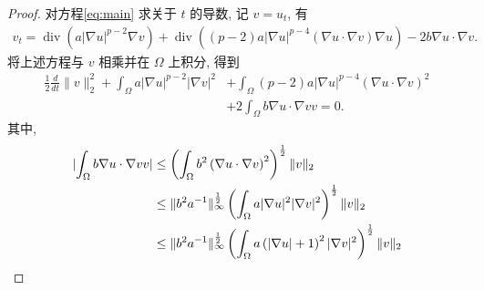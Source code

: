 \documentclass[oneside,longtitle]{LZUthesis}
\newtheorem{proofpart}{part}
\numberwithin{equation}{chapter}
\newcommand*\abs[1]{\lvert#1\rvert}
\newcommand*\norm[1]{\lVert#1\rVert}
\newcommand*\Brace[1]{\lbrace#1\rbrace}
\newcommand\R{\mathbb{R}}
\DeclareMathOperator{\Div}{div}
\begin{document}
\begin{proof}
	对方程\eqref{eq:main} 求关于 $t$ 的导数, 记 $v = u_t$, 有
	\begin{equation*}
		\begin{split}
			v_t
			= \Div\left(a\abs{\nabla u}^{p-2}\nabla v\right)
			+ \Div\left(\left(p-2\right)a \abs{\nabla u}^{p-4}\left(\nabla u \cdot \nabla v\right)\nabla u\right)
			- 2b\nabla u \cdot \nabla v.
		\end{split}
	\end{equation*}
	将上述方程与 $v$ 相乘并在 $\Omega$ 上积分, 得到
	\begin{equation*}
		\begin{split}
			\frac{1}{2}\frac{d}{dt}\norm{v}_2^2
			+ \int_{\Omega}a\abs{\nabla u}^{p-2}\abs{\nabla v}^2
			&+ \int_{\Omega}\left(p-2\right)a\abs{\nabla u}^{p-4}\left(\nabla u
			\cdot \nabla v\right)^2\\
			&+ 2\int_{\Omega}b\nabla u \cdot \nabla v v
			= 0.
		\end{split}
	\end{equation*}
	其中,
	\begin{equation*}
		\begin{split}
			\abs{\int_{\Omega}b\nabla u \cdot \nabla v v}
			&\leq \left(\int_{\Omega}b^2\left(\nabla u
			\cdot \nabla v\right)^2\right)^{\frac{1}{2}}
			\*\norm{v}_2\\
			&\leq \norm{b^2 a^{-1}}_{\infty}^{\frac{1}{2}}
			\left(\int_{\Omega}a\abs{\nabla u}^2\abs{\nabla v}^2\right)^{\frac{1}{2}}\norm{v}_2\\
			&\leq \norm{b^2 a^{-1}}_{\infty}^{\frac{1}{2}}
			\left(\int_{\Omega}a\left(\abs{\nabla u}+1\right)^2\abs{\nabla v}^2\right)^{\frac{1}{2}}\norm{v}_2\\

\end{split}
\end{equation*}
\end{proof}
\end{document}
